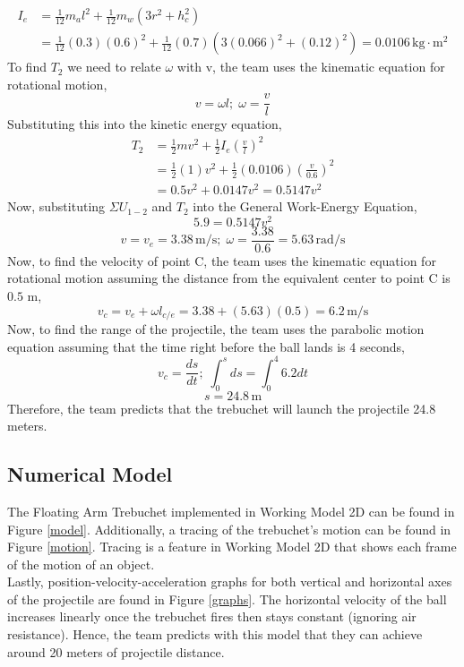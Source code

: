 \documentclass[12pt, titlepage]{article}
\begin{document}
    \begin{align*}
        I_e &= \frac{1}{12}m_al^2 + \frac{1}{12}m_w(3r^2 + h_c^2) \\
        &= \frac{1}{12}(0.3)(0.6)^2 + \frac{1}{12}(0.7)\left(3(0.066)^2 + (0.12)^2\right) = 0.0106 \, \mathrm{kg} \cdot \mathrm{m}^2
    \end{align*}
    To find $T_2$ we need to relate $\omega$ with v, the team uses the kinematic equation for rotational motion,
    $$v = \omega l;\; \omega = \frac{v}{l}$$
    Substituting this into the kinetic energy equation,
    \begin{align*}
        T_2 &= \frac{1}{2}mv^2 + \frac{1}{2}I_e\left(\frac{v}{l}\right)^2 \\
        &= \frac{1}{2}(1)v^2 + \frac{1}{2}(0.0106)\left(\frac{v}{0.6}\right)^2 \\
        &= 0.5v^2 + 0.0147v^2 = 0.5147v^2
    \end{align*}
    Now, substituting $\Sigma U_{1-2}$ and $T_2$ into the General Work-Energy Equation,
    $$5.9 = 0.5147v^2$$
    $$v = v_e = 3.38 \, \mathrm{m/s};\; \omega = \frac{3.38}{0.6} = 5.63 \, \mathrm{rad/s}$$
    Now, to find the velocity of point C, the team uses the kinematic equation for rotational motion assuming the distance from the equivalent center to point C is $0.5$ m,
    $$v_c = v_e + \omega l_{c/e} = 3.38 + (5.63)(0.5) = 6.2 \, \mathrm{m/s}$$
    Now, to find the range of the projectile, the team uses the parabolic motion equation assuming that the time right before the ball lands is 4 seconds,
    $$v_c = \frac{ds}{dt};\; \displaystyle\int_{0}^{s}ds = \displaystyle\int_{0}^{4}6.2dt$$
    \[ \boxed{s = 24.8 \, \mathrm{m}} \]
    Therefore, the team predicts that the trebuchet will launch the projectile 24.8 meters.
    \newpage
    \subsection{Numerical Model}
    The Floating Arm Trebuchet implemented in Working Model 2D can be found 
    in Figure \ref{model}. Additionally, a tracing of the trebuchet's motion 
    can be found in Figure \ref{motion}. Tracing is a feature in Working 
    Model 2D that shows each frame of the motion of an object.\\[10pt]
    Lastly, position-velocity-acceleration graphs for both vertical and 
    horizontal axes of the projectile are found in Figure \ref{graphs}.
    The horizontal velocity of the ball increases linearly once the trebuchet fires
    then stays constant (ignoring air resistance). Hence, the team predicts 
    with this model that they can achieve around 20 meters of projectile
    distance.
\end{document}
